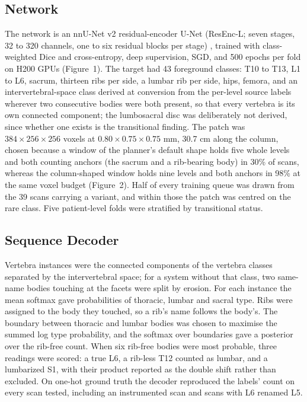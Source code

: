 \documentclass[12pt]{article}
\begin{document}
\subsection*{Network}
The network is an nnU-Net v2 residual-encoder U-Net (ResEnc-L; seven stages, 32 to 320 channels, one to six residual blocks per stage) \citep{Isensee2020NnU-Net:Segmentation,Isensee2024Nnu-netSegmentation}, trained with class-weighted Dice and cross-entropy, deep supervision, SGD, and 500 epochs per fold on H200 GPUs (Figure~1). The target had 43 foreground classes: T10 to T13, L1 to L6, sacrum, thirteen ribs per side, a lumbar rib per side, hips, femora, and an intervertebral-space class derived at conversion from the per-level source labels wherever two consecutive bodies were both present, so that every vertebra is its own connected component; the lumbosacral disc was deliberately not derived, since whether one exists is the transitional finding. The patch was $384 \times 256 \times 256$ voxels at $0.80 \times 0.75 \times 0.75$ mm, 30.7 cm along the column, chosen because a window of the planner's default shape holds five whole levels and both counting anchors (the sacrum and a rib-bearing body) in 30\% of scans, whereas the column-shaped window holds nine levels and both anchors in 98\% at the same voxel budget (Figure~2). Half of every training queue was drawn from the 39 scans carrying a variant, and within those the patch was centred on the rare class. Five patient-level folds were stratified by transitional status.

\subsection*{Sequence Decoder}
Vertebra instances were the connected components of the vertebra classes separated by the intervertebral space; for a system without that class, two same-name bodies touching at the facets were split by erosion. For each instance the mean softmax gave probabilities of thoracic, lumbar and sacral type. Ribs were assigned to the body they touched, so a rib's name follows the body's. The boundary between thoracic and lumbar bodies was chosen to maximise the summed log type probability, and the softmax over boundaries gave a posterior over the rib-free count. When six rib-free bodies were most probable, three readings were scored: a true L6, a rib-less T12 counted as lumbar, and a lumbarized S1, with their product reported as the double shift rather than excluded. On one-hot ground truth the decoder reproduced the labels' count on every scan tested, including an instrumented scan and scans with L6 renamed L5.
\end{document}
